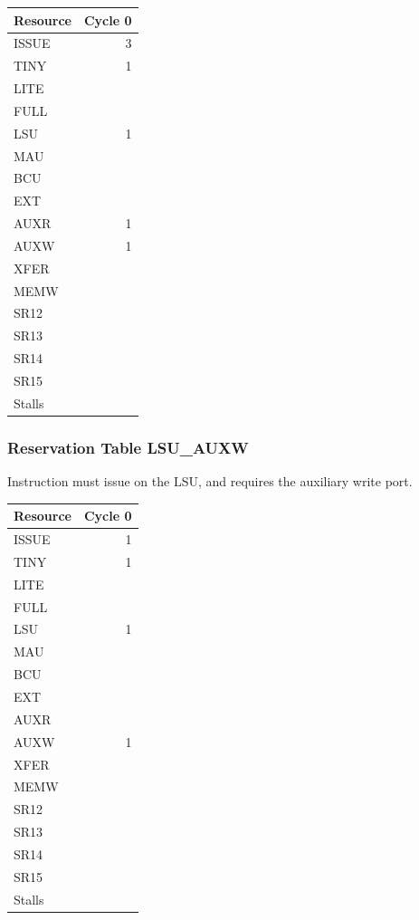 \begin{tabular}{|l|r|} \hline
Resource	& Cycle 0 \\ \hline
\textsf{ISSUE}	& 3	\\
\textsf{TINY}	& 1	\\
\textsf{LITE}	& 	\\
\textsf{FULL}	& 	\\
\textsf{LSU}	& 1	\\
\textsf{MAU}	& 	\\
\textsf{BCU}	& 	\\
\textsf{EXT}	& 	\\
\textsf{AUXR}	& 1	\\
\textsf{AUXW}	& 1	\\
\textsf{XFER}	& 	\\
\textsf{MEMW}	& 	\\
\textsf{SR12}	& 	\\
\textsf{SR13}	& 	\\
\textsf{SR14}	& 	\\
\textsf{SR15}	& 	\\
\hline Stalls	& 	\\
\hline \end{tabular}

\subsubsection{Reservation Table LSU\_AUXW} \label{sec:reservation-LSU-AUXW}

Instruction must issue on the LSU, and requires the auxiliary write port.
\medskip

\begin{tabular}{|l|r|} \hline
Resource	& Cycle 0 \\ \hline
\textsf{ISSUE}	& 1	\\
\textsf{TINY}	& 1	\\
\textsf{LITE}	& 	\\
\textsf{FULL}	& 	\\
\textsf{LSU}	& 1	\\
\textsf{MAU}	& 	\\
\textsf{BCU}	& 	\\
\textsf{EXT}	& 	\\
\textsf{AUXR}	& 	\\
\textsf{AUXW}	& 1	\\
\textsf{XFER}	& 	\\
\textsf{MEMW}	& 	\\
\textsf{SR12}	& 	\\
\textsf{SR13}	& 	\\
\textsf{SR14}	& 	\\
\textsf{SR15}	& 	\\
\hline Stalls	& 	\\
\hline \end{tabular}

